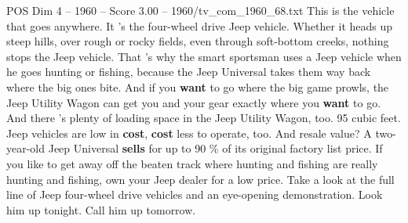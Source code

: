\begin{textsample}{POS Dim 4 – 1960 – Score 3.00 – 1960/tv\_com\_1960\_68.txt}  \label{ex:f4_pos_004}
This is the vehicle that goes anywhere.
It 's the four-wheel drive Jeep vehicle.
Whether it heads up steep hills, over rough or rocky fields, even through soft-bottom creeks, nothing stops the Jeep vehicle.
That 's why the smart sportsman uses a Jeep vehicle when he goes hunting or fishing, because the Jeep Universal takes them way back where the big ones bite.
And if you \textbf{want} to go where the big game prowls, the Jeep Utility Wagon can get you and your gear exactly where you \textbf{want} to go.
And there 's plenty of loading space in the Jeep Utility Wagon, too. 95 cubic feet.
Jeep vehicles are low in \textbf{cost}, \textbf{cost} less to operate, too.
And resale value?
A two-year-old Jeep Universal \textbf{sells} for up to 90 \% of its original factory list price.
If you like to get away off the beaten track where hunting and fishing are really hunting and fishing, own your Jeep dealer for a low price.
Take a look at the full line of Jeep four-wheel drive vehicles and an eye-opening demonstration.
Look him up tonight.
Call him up tomorrow.

\end{textsample}
